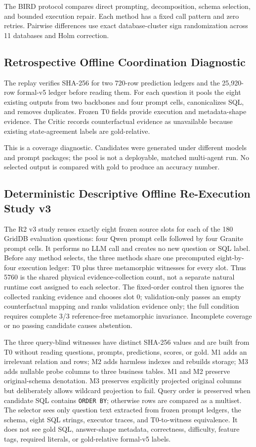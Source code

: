 \documentclass[applsci,article,submit,moreauthors]{Definitions/mdpi}
\begin{document}
The BIRD protocol compares direct prompting, decomposition, schema selection, and bounded execution repair. Each method has a fixed call pattern and zero retries. Pairwise differences use exact database-cluster sign randomization across 11 databases and Holm correction.

\subsection{Retrospective Offline Coordination Diagnostic}

The replay verifies SHA-256 for two 720-row prediction ledgers and the 25,920-row formal-v5 ledger before reading them. For each question it pools the eight existing outputs from two backbones and four prompt cells, canonicalizes SQL, and removes duplicates. Frozen T0 fields provide execution and metadata-shape evidence. The Critic records counterfactual evidence as unavailable because existing state-agreement labels are gold-relative.

This is a coverage diagnostic. Candidates were generated under different models and prompt packages; the pool is not a deployable, matched multi-agent run. No selected output is compared with gold to produce an accuracy number.

\subsection{Deterministic Descriptive Offline Re-Execution Study v3}

The R2 v3 study reuses exactly eight frozen source slots for each of the 180 GridDB evaluation questions: four Qwen prompt cells followed by four Granite prompt cells. It performs no LLM call and creates no new question or SQL label. Before any method selects, the three methods share one precomputed eight-by-four execution ledger: T0 plus three metamorphic witnesses for every slot. Thus 5760 is the shared physical evidence-collection count, not a separate natural runtime cost assigned to each selector. The fixed-order control then ignores the collected ranking evidence and chooses slot 0; validation-only passes an empty counterfactual mapping and ranks validation evidence only; the full condition requires complete 3/3 reference-free metamorphic invariance. Incomplete coverage or no passing candidate causes abstention.

The three query-blind witnesses have distinct SHA-256 values and are built from T0 without reading questions, prompts, predictions, scores, or gold. M1 adds an irrelevant relation and rows; M2 adds harmless indexes and rebuilds storage; M3 adds nullable probe columns to three business tables. M1 and M2 preserve original-schema denotation. M3 preserves explicitly projected original columns but deliberately allows wildcard projection to fail. Query order is preserved when candidate SQL contains \texttt{ORDER BY}; otherwise rows are compared as a multiset. The selector sees only question text extracted from frozen prompt ledgers, the schema, eight SQL strings, executor traces, and T0-to-witness equivalence. It does not see gold SQL, answer-shape metadata, correctness, difficulty, feature tags, required literals, or gold-relative formal-v5 labels.
\end{document}
